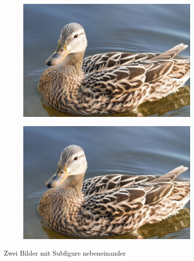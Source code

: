 \documentclass[15pt,ngerman]{scrreprt}
\begin{document}
\begin{figure}
\begin{subfigure}[c]{0.48\textwidth}

\includegraphics[width=\textwidth]{./Bilder/image1}

\end{subfigure}
\begin{subfigure}[c]{0.48\textwidth}
\includegraphics[width=\textwidth]{./Bilder/image1}
\end{subfigure}
\caption{Zwei Bilder mit Subfigure nebeneinander}
\end{figure}
\end{document}
